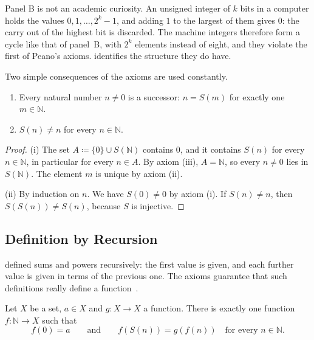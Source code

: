 Panel B is not an academic curiosity. An unsigned integer of $k$ bits in a computer holds the values $0,1,\ldots,2^k-1$, and adding $1$ to the largest of them gives $0$: the carry out of the highest bit is discarded. The machine integers therefore form a cycle like that of panel~B, with $2^k$ elements instead of eight, and they violate the first of Peano's axioms.  identifies the structure they do have.

Two simple consequences of the axioms are used constantly.

\begin{proposition}
\label{prop:peano-basic}
\leavevmode
\begin{enumerate}
\item Every natural number $n\ne0$ is a successor: $n=S(m)$ for exactly one $m\in\mathbb N$.
\item $S(n)\ne n$ for every $n\in\mathbb N$.
\end{enumerate}
\end{proposition}

\begin{proof}
(i) The set $A\coloneqq\{0\}\cup S(\mathbb N)$ contains $0$, and it contains $S(n)$ for every $n\in\mathbb N$, in particular for every $n\in A$. By axiom (iii), $A=\mathbb N$, so every $n\ne0$ lies in $S(\mathbb N)$. The element $m$ is unique by axiom (ii).

(ii) By induction on $n$. We have $S(0)\ne0$ by axiom (i). If $S(n)\ne n$, then $S(S(n))\ne S(n)$, because $S$ is injective.
\end{proof}

\subsection{Definition by Recursion}

 defined sums and powers recursively: the first value is given, and each further value is given in terms of the previous one. The axioms guarantee that such definitions really define a function~\cite{dedekind1888}.

\begin{theorem}
\label{thm:recursion}
Let $X$ be a set, $a\in X$ and $g\colon X\to X$ a function. There is exactly one function $f\colon\mathbb N\to X$ such that
\[
f(0)=a\qquad\text{and}\qquad f(S(n))=g(f(n))\quad\text{for every }n\in\mathbb N.
\]
\end{theorem}

